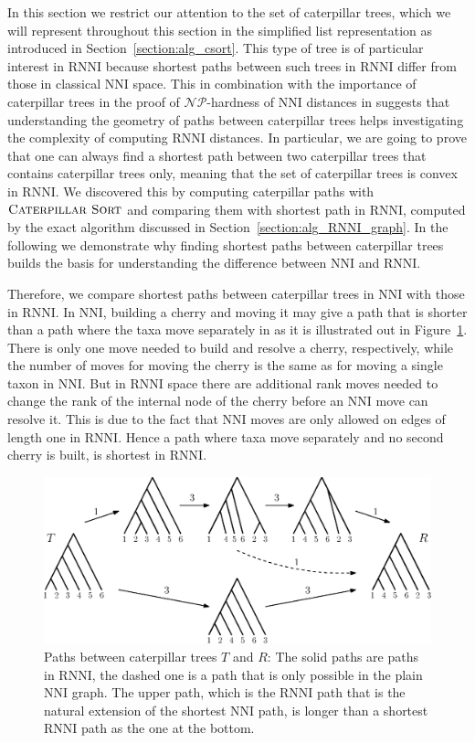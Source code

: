 \documentclass{amsart}
\newcommand{\np}{\mathcal{NP}}
\newcommand{\nni}{\mathrm{NNI}}
\newcommand{\rnni}{\mathrm{RNNI}}
\newcommand{\csort}{\textsc{Caterpillar Sort}}
\begin{document}
In this section we restrict our attention to the set of caterpillar trees, which we will represent throughout this section in the simplified list representation as introduced in Section~\ref{section:alg_csort}.
This type of tree is of particular interest in $\rnni$ because shortest paths between such trees in $\rnni$ differ from those in classical $\nni$ space.
This in combination with the importance of caterpillar trees in the proof of $\np$-hardness of $\nni$ distances in \autocite{Dasgupta2000-xa} suggests that understanding the geometry of paths between caterpillar trees helps investigating the complexity of computing $\rnni$ distances.
In particular, we are going to prove that one can always find a shortest path between two caterpillar trees that contains caterpillar trees only, meaning that the set of caterpillar trees is convex in $\rnni$.
We discovered this by computing caterpillar paths with $\csort$ and comparing them with shortest path in $\rnni$, computed by the exact algorithm discussed in Section~\ref{section:alg_RNNI_graph}.
In the following we demonstrate why finding shortest paths between caterpillar trees builds the basis for understanding the difference between $\nni$ and $\rnni$.

Therefore, we compare shortest paths between caterpillar trees in $\nni$ with those in $\rnni$.
In $\nni$, building a cherry and moving it may give a path that is shorter than a path where the taxa move separately in as it is illustrated out in Figure~\ref{fig:NNI_vs_RNNI}.
There is only one move needed to build and resolve a cherry, respectively, while the number of moves for moving the cherry is the same as for moving a single taxon in $\nni$.
But in $\rnni$ space there are additional rank moves needed to change the rank of the internal node of the cherry before an $\nni$ move can resolve it.
This is due to the fact that $\nni$ moves are only allowed on edges of length one in $\rnni$.
Hence a path where taxa move separately and no second cherry is built, is shortest in $\rnni$.

\begin{figure}[H]
\centering
\includegraphics[width=\textwidth]{NNI_vs_RNNI}
\vspace{12pt}
\caption{Paths between caterpillar trees $T$ and $R$: The solid paths are paths in $\rnni$, the dashed one is a path that is only possible in the plain $\nni$ graph.
The upper path, which is the $\rnni$ path that is the natural extension of the shortest $\nni$ path, is longer than a shortest $\rnni$ path as the one at the bottom.}
\label{fig:NNI_vs_RNNI}
\end{figure}
\end{document}
